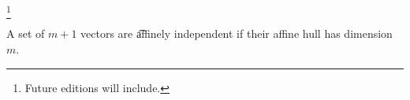 
\footnote{Future editions will include.}


A set of $m+1$ vectors are \t{affinely independent} if their affine hull has dimension $m$.

\blankpage
